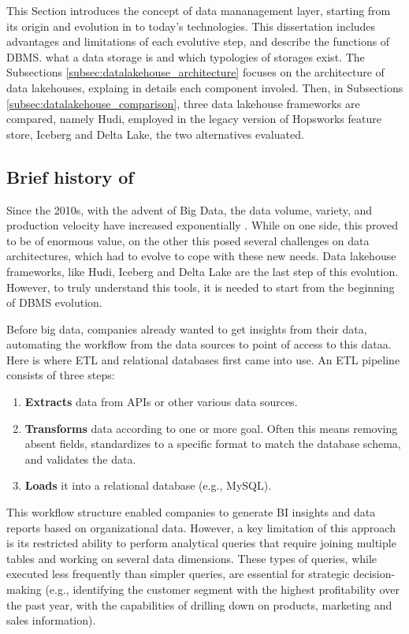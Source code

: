 This Section introduces the concept of data mananagement layer, starting from its origin and evolution in to today's technologies. This dissertation includes advantages and limitations of each evolutive step, and describe the functions of \gls{DBMS}. what a data storage is and which typologies of storages exist. The Subsections \ref{subsec:datalakehouse_architecture} focuses on the architecture of data lakehouses, explaing in details each component involed. Then, in Subsections \ref{subsec:datalakehouse_comparison}, three data lakehouse frameworks are compared, namely Hudi, employed in the legacy version of Hopsworks feature store, Iceberg and Delta Lake, the two alternatives evaluated.

\subsection{Brief history of }
\label{subsec:history_DBMS}
Since the 2010s, with the advent of Big Data, the data volume, variety, and production velocity have increased exponentially \cite{ederUnstructuredData802008, penceWhatBigData2014}. While on one side, this proved to be of enormous value, on the other this posed several challenges \cite{demchenkoAddressingBigData2012} on data architectures, which had to evolve to cope with these new needs. Data lakehouse frameworks, like Hudi, Iceberg and Delta Lake \cite{rajaperumalUberEngineeringIncremental2017,IcebergExamples2024,armbrustDeltaLakeHighperformance2020} are the last step of this evolution. However, to truly understand this tools, it is needed to start from the beginning of \gls{DBMS} evolution.

\smallskip

Before big data, companies already wanted to get insights from their data, automating the workflow from the data sources to point of access to this dataa. Here is where \gls{ETL} and relational databases first came into use. An \gls{ETL} pipeline consists of three steps:
\begin{enumerate}
    \item \textbf{Extracts} data from \glspl{API} or other various data sources.
    \item \textbf{Transforms} data according to one or more goal. Often this means removing absent fields, standardizes to a specific format to match the database schema, and validates the data.
    \item \textbf{Loads} it into a relational database (e.g., MySQL).
\end{enumerate}
This workflow structure enabled companies to generate \gls{BI} insights and data reports based on organizational data. However, a key limitation of this approach is its restricted ability to perform analytical queries that require joining multiple tables and working on several data dimensions. These types of queries, while executed less frequently than simpler queries, are essential for strategic decision-making (e.g., identifying the customer segment with the highest profitability over the past year, with the capabilities of drilling down on products, marketing and sales information).

